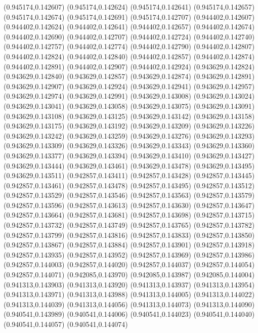 (0.945174,0.142607)
(0.945174,0.142624)
(0.945174,0.142641)
(0.945174,0.142657)
(0.945174,0.142674)
(0.945174,0.142691)
(0.945174,0.142707)
(0.944402,0.142607)
(0.944402,0.142624)
(0.944402,0.142641)
(0.944402,0.142657)
(0.944402,0.142674)
(0.944402,0.142690)
(0.944402,0.142707)
(0.944402,0.142724)
(0.944402,0.142740)
(0.944402,0.142757)
(0.944402,0.142774)
(0.944402,0.142790)
(0.944402,0.142807)
(0.944402,0.142824)
(0.944402,0.142840)
(0.944402,0.142857)
(0.944402,0.142874)
(0.944402,0.142891)
(0.944402,0.142907)
(0.944402,0.142924)
(0.943629,0.142824)
(0.943629,0.142840)
(0.943629,0.142857)
(0.943629,0.142874)
(0.943629,0.142891)
(0.943629,0.142907)
(0.943629,0.142924)
(0.943629,0.142941)
(0.943629,0.142957)
(0.943629,0.142974)
(0.943629,0.142991)
(0.943629,0.143008)
(0.943629,0.143024)
(0.943629,0.143041)
(0.943629,0.143058)
(0.943629,0.143075)
(0.943629,0.143091)
(0.943629,0.143108)
(0.943629,0.143125)
(0.943629,0.143142)
(0.943629,0.143158)
(0.943629,0.143175)
(0.943629,0.143192)
(0.943629,0.143209)
(0.943629,0.143226)
(0.943629,0.143242)
(0.943629,0.143259)
(0.943629,0.143276)
(0.943629,0.143293)
(0.943629,0.143309)
(0.943629,0.143326)
(0.943629,0.143343)
(0.943629,0.143360)
(0.943629,0.143377)
(0.943629,0.143394)
(0.943629,0.143410)
(0.943629,0.143427)
(0.943629,0.143444)
(0.943629,0.143461)
(0.943629,0.143478)
(0.943629,0.143495)
(0.943629,0.143511)
(0.942857,0.143411)
(0.942857,0.143428)
(0.942857,0.143445)
(0.942857,0.143461)
(0.942857,0.143478)
(0.942857,0.143495)
(0.942857,0.143512)
(0.942857,0.143529)
(0.942857,0.143546)
(0.942857,0.143563)
(0.942857,0.143579)
(0.942857,0.143596)
(0.942857,0.143613)
(0.942857,0.143630)
(0.942857,0.143647)
(0.942857,0.143664)
(0.942857,0.143681)
(0.942857,0.143698)
(0.942857,0.143715)
(0.942857,0.143732)
(0.942857,0.143749)
(0.942857,0.143765)
(0.942857,0.143782)
(0.942857,0.143799)
(0.942857,0.143816)
(0.942857,0.143833)
(0.942857,0.143850)
(0.942857,0.143867)
(0.942857,0.143884)
(0.942857,0.143901)
(0.942857,0.143918)
(0.942857,0.143935)
(0.942857,0.143952)
(0.942857,0.143969)
(0.942857,0.143986)
(0.942857,0.144003)
(0.942857,0.144020)
(0.942857,0.144037)
(0.942857,0.144054)
(0.942857,0.144071)
(0.942085,0.143970)
(0.942085,0.143987)
(0.942085,0.144004)
(0.941313,0.143903)
(0.941313,0.143920)
(0.941313,0.143937)
(0.941313,0.143954)
(0.941313,0.143971)
(0.941313,0.143988)
(0.941313,0.144005)
(0.941313,0.144022)
(0.941313,0.144039)
(0.941313,0.144056)
(0.941313,0.144073)
(0.941313,0.144090)
(0.940541,0.143989)
(0.940541,0.144006)
(0.940541,0.144023)
(0.940541,0.144040)
(0.940541,0.144057)
(0.940541,0.144074)
